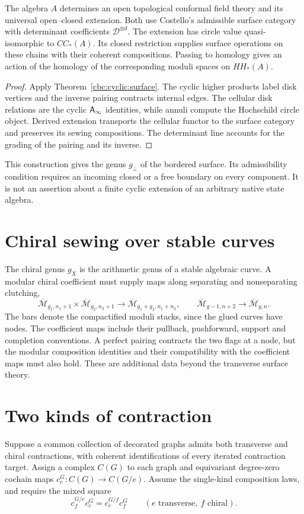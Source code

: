 \begin{theorem}\label{thm:ribbon-action}
The algebra $A$ determines an open topological conformal field theory and its universal open--closed extension.
Both use Costello's admissible surface category with determinant coefficients $\mathcal D^{\otimes d}$.
The extension has circle value quasi-isomorphic to $CC_*(A)$.
Its closed restriction supplies surface operations on these chains with their coherent compositions.
Passing to homology gives an action of the homology of the corresponding moduli spaces on $HH_*(A)$.
\end{theorem}
\begin{proof}
Apply Theorem~\ref{cbc:cyclic:surface}.
The cyclic higher products label disk vertices and the inverse pairing contracts internal edges.
The cellular disk relations are the cyclic $\mathsf A_\infty$ identities, while annuli compute the Hochschild circle object.
Derived extension transports the cellular functor to the surface category and preserves its sewing compositions.
The determinant line accounts for the grading of the pairing and its inverse.
\end{proof}

This construction gives the genus $g_\perp$ of the bordered surface.
Its admissibility condition requires an incoming closed or a free boundary on every component.
It is not an assertion about a finite cyclic extension of an arbitrary native state algebra.

\section{Chiral sewing over stable curves}
The chiral genus $g_X$ is the arithmetic genus of a stable algebraic curve.
A modular chiral coefficient must supply maps along separating and nonseparating clutching,
\[
 \overline{\mathcal M}_{g_1,n_1+1}\times
 \overline{\mathcal M}_{g_2,n_2+1}
 \longrightarrow\overline{\mathcal M}_{g_1+g_2,n_1+n_2},
 \qquad
 \overline{\mathcal M}_{g-1,n+2}
 \longrightarrow\overline{\mathcal M}_{g,n}.
\]
The bars denote the compactified moduli stacks, since the glued curves have nodes.
The coefficient maps include their pullback, pushforward, support and completion conventions.
A perfect pairing contracts the two flags at a node, but the modular composition identities and their compatibility with the coefficient maps must also hold.
These are additional data beyond the transverse surface theory.

\section{Two kinds of contraction}
Suppose a common collection of decorated graphs admits both transverse and chiral contractions, with coherent identifications of every iterated contraction target.
Assign a complex $C(G)$ to each graph and equivariant degree-zero cochain maps $c_e^G:C(G)\to C(G/e)$.
Assume the single-kind composition laws, and require the mixed square
\[
 c_f^{G/e}c_e^G=c_e^{G/f}c_f^G
 \qquad(e\text{ transverse},\ f\text{ chiral}).
\]

